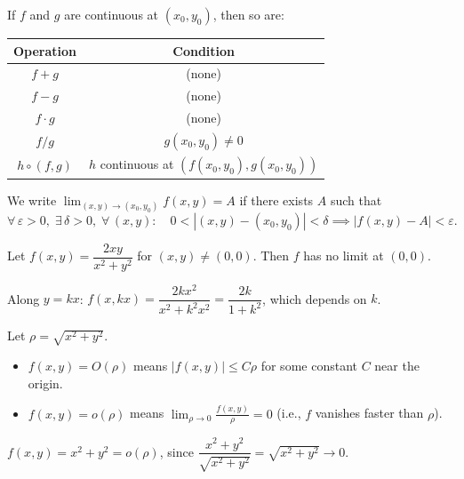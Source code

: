 \documentclass[11pt]{report}
\newcommand{\eps}{\varepsilon}
\begin{document}
\begin{remark}
If $f$ and $g$ are continuous at $(x_0, y_0)$, then so are:
\begin{center}
\begin{tabular}{|c|c|}
\hline
\textbf{Operation} & \textbf{Condition} \\
\hline
$f + g$ & (none) \\
$f - g$ & (none) \\
$f \cdot g$ & (none) \\
$f / g$ & $g(x_0, y_0) \neq 0$ \\
$h \circ (f, g)$ & $h$ continuous at $(f(x_0, y_0), g(x_0, y_0))$ \\
\hline
\end{tabular}
\end{center}
\end{remark}

\begin{definition}
We write $\displaystyle\lim_{(x,y) \to (x_0, y_0)} f(x, y) = A$ if there exists $A$ such that
\[
\forall\, \eps > 0,\; \exists\, \delta > 0,\; \forall\, (x, y): \quad 0 < |(x, y) - (x_0, y_0)| < \delta \implies |f(x, y) - A| < \eps.
\]
\end{definition}

\begin{example}
Let $f(x, y) = \dfrac{2xy}{x^2 + y^2}$ for $(x, y) \neq (0, 0)$. Then $f$ has no limit at $(0, 0)$.

Along $y = kx$: $f(x, kx) = \dfrac{2kx^2}{x^2 + k^2 x^2} = \dfrac{2k}{1 + k^2}$, which depends on $k$.
\end{example}

\begin{definition}
Let $\rho = \sqrt{x^2 + y^2}$.
\begin{itemize}[itemsep=4pt]
    \item $f(x, y) = O(\rho)$ means $|f(x, y)| \leq C\rho$ for some constant $C$ near the origin.
    \item $f(x, y) = o(\rho)$ means $\displaystyle\lim_{\rho \to 0} \frac{f(x, y)}{\rho} = 0$ (i.e., $f$ vanishes faster than $\rho$).
\end{itemize}
\end{definition}

\begin{example}
$f(x, y) = x^2 + y^2 = o(\rho)$, since $\dfrac{x^2 + y^2}{\sqrt{x^2 + y^2}} = \sqrt{x^2 + y^2} \to 0$.
\end{example}
\end{document}
